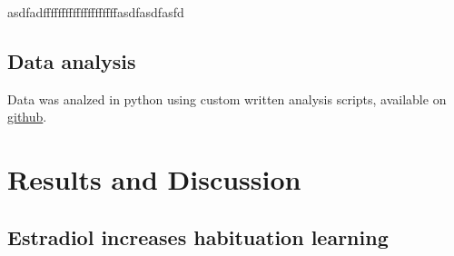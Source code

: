 \documentclass[9pt,lineno]{RandlettLab_elife}
\begin{document}
asdfadffffffffffffffffffffasdfasdfasfd

\subsection{Data analysis}

Data was analzed in python using custom written analysis scripts, available on \href{https://github.com/owenrandlett/2025\_HabEstrogen}{github}. 


\newpage
\section{Results and Discussion}

\subsection{Estradiol increases habituation learning}
\end{document}
